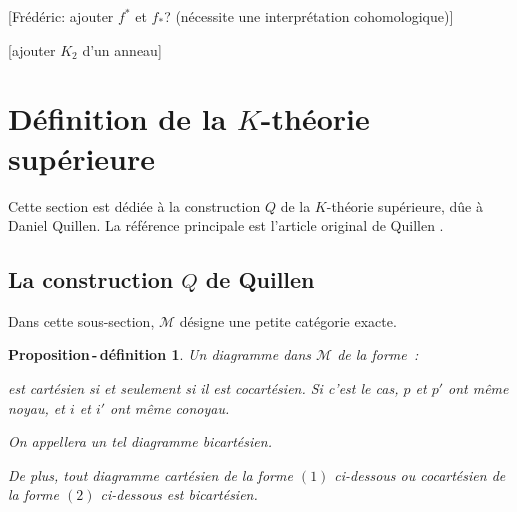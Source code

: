 \documentclass{amsart}
\theoremstyle{plain}
\newtheorem{propdefi}[theo]{Proposition\,-\,définition}
\theoremstyle{definition}
\theoremstyle{remark}
\newcommand{\M}{\mathcal{M}}
\begin{document}
[Frédéric: ajouter $f^*$ et $f_*$? (nécessite une interprétation cohomologique)]

[ajouter $K_2$ d'un anneau]

\section{\texorpdfstring{Définition de la $K$-théorie supérieure}{Définition de la K-théorie supérieure}}

Cette section est dédiée à la construction $Q$ de la $K$-théorie supérieure, dûe à Daniel Quillen. La référence principale est l'article
original de Quillen \cite{Quil}.

\subsection{\texorpdfstring{La construction $Q$ de Quillen}{La construction Q de Quillen}}

Dans cette sous-section, $\M$ désigne une petite catégorie exacte.

\begin{propdefi}\label{propBicartesien}
  Un diagramme dans $\M$ de la forme~:
  \begin{center}
  \end{center}
  est cartésien si et seulement si il est cocartésien. Si c'est le cas, $p$ et $p'$ ont même noyau, et $i$ et $i'$ ont même conoyau.
  
  On appellera un tel diagramme bicartésien.

  De plus, tout diagramme cartésien de la forme $(1)$ ci-dessous ou cocartésien de la forme $(2)$ ci-dessous est bicartésien.
  \begin{center}
  \end{center}
\end{propdefi}
\end{document}
